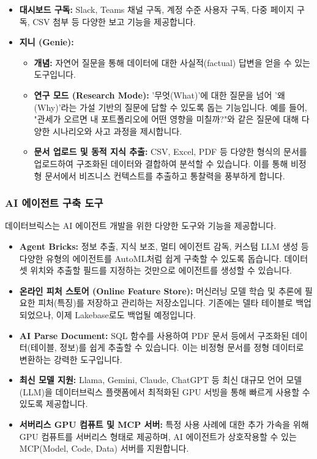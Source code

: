 \documentclass[11pt,a4paper]{article}
\theoremstyle{definition}
\begin{document}
\begin{itemize}
    \item \textbf{대시보드 구독:} Slack, Teams 채널 구독, 계정 수준 사용자 구독, 다중 페이지 구독, CSV 첨부 등 다양한 보고 기능을 제공합니다.
    \item \textbf{지니 (Genie):}
    \begin{itemize}
        \item \textbf{개념:} 자연어 질문을 통해 데이터에 대한 사실적(factual) 답변을 얻을 수 있는 도구입니다.
        \item \textbf{연구 모드 (Research Mode):} '무엇(What)'에 대한 질문을 넘어 '왜(Why)'라는 가설 기반의 질문에 답할 수 있도록 돕는 기능입니다. 예를 들어, "관세가 오르면 내 포트폴리오에 어떤 영향을 미칠까?"와 같은 질문에 대해 다양한 시나리오와 사고 과정을 제시합니다.
        \item \textbf{문서 업로드 및 동적 지식 추출:} CSV, Excel, PDF 등 다양한 형식의 문서를 업로드하여 구조화된 데이터와 결합하여 분석할 수 있습니다. 이를 통해 비정형 문서에서 비즈니스 컨텍스트를 추출하고 통찰력을 풍부하게 합니다.
    \end{itemize}
\end{itemize}

\subsubsection{AI 에이전트 구축 도구}
데이터브릭스는 AI 에이전트 개발을 위한 다양한 도구와 기능을 제공합니다.

\begin{itemize}
    \item \textbf{Agent Bricks:} 정보 추출, 지식 보조, 멀티 에이전트 감독, 커스텀 LLM 생성 등 다양한 유형의 에이전트를 AutoML처럼 쉽게 구축할 수 있도록 돕습니다. 데이터셋 위치와 추출할 필드를 지정하는 것만으로 에이전트를 생성할 수 있습니다.
    \item \textbf{온라인 피처 스토어 (Online Feature Store):} 머신러닝 모델 학습 및 추론에 필요한 피처(특징)를 저장하고 관리하는 저장소입니다. 기존에는 델타 테이블로 백업되었으나, 이제 Lakebase로도 백업될 예정입니다.
    \item \textbf{AI Parse Document:} SQL 함수를 사용하여 PDF 문서 등에서 구조화된 데이터(테이블, 정보)를 쉽게 추출할 수 있습니다. 이는 비정형 문서를 정형 데이터로 변환하는 강력한 도구입니다.
    \item \textbf{최신 모델 지원:} Llama, Gemini, Claude, ChatGPT 등 최신 대규모 언어 모델(LLM)을 데이터브릭스 플랫폼에서 최적화된 GPU 서빙을 통해 빠르게 사용할 수 있도록 제공합니다.
    \item \textbf{서버리스 GPU 컴퓨트 및 MCP 서버:} 특정 사용 사례에 대한 추가 가속을 위해 GPU 컴퓨트를 서버리스 형태로 제공하며, AI 에이전트가 상호작용할 수 있는 MCP(Model, Code, Data) 서버를 지원합니다.
\end{itemize}
\end{document}
